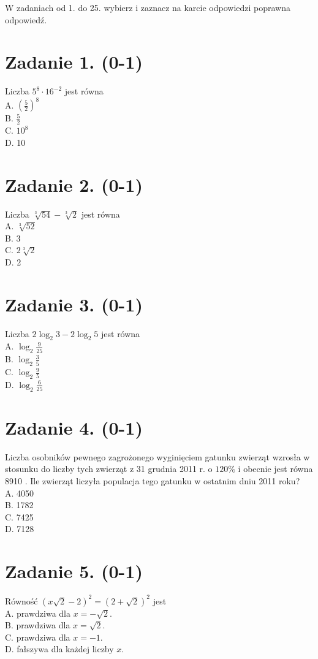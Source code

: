 \documentclass[10pt]{article}
\begin{document}
W zadaniach od 1. do 25. wybierz i zaznacz na karcie odpowiedzi poprawna odpowiedź.

\section*{Zadanie 1. (0-1)}
Liczba \(5^{8} \cdot 16^{-2}\) jest równa\\
A. \(\left(\frac{5}{2}\right)^{8}\)\\
B. \(\frac{5}{2}\)\\
C. \(10^{8}\)\\
D. 10

\section*{Zadanie 2. (0-1)}
Liczba \(\sqrt[3]{54}-\sqrt[3]{2}\) jest równa\\
A. \(\sqrt[3]{52}\)\\
B. 3\\
C. \(2 \sqrt[3]{2}\)\\
D. 2

\section*{Zadanie 3. (0-1)}
Liczba \(2 \log _{2} 3-2 \log _{2} 5\) jest równa\\
A. \(\log _{2} \frac{9}{25}\)\\
B. \(\log _{2} \frac{3}{5}\)\\
C. \(\log _{2} \frac{9}{5}\)\\
D. \(\log _{2} \frac{6}{25}\)

\section*{Zadanie 4. (0-1)}
Liczba osobników pewnego zagrożonego wyginięciem gatunku zwierząt wzrosła w stosunku do liczby tych zwierząt z 31 grudnia 2011 r. o \(120 \%\) i obecnie jest równa 8910 . Ile zwierząt liczyła populacja tego gatunku w ostatnim dniu 2011 roku?\\
A. 4050\\
B. 1782\\
C. 7425\\
D. 7128

\section*{Zadanie 5. (0-1)}
Równość \((x \sqrt{2}-2)^{2}=(2+\sqrt{2})^{2}\) jest\\
A. prawdziwa dla \(x=-\sqrt{2}\).\\
B. prawdziwa dla \(x=\sqrt{2}\).\\
C. prawdziwa dla \(x=-1\).\\
D. fałszywa dla każdej liczby \(x\).
\end{document}
